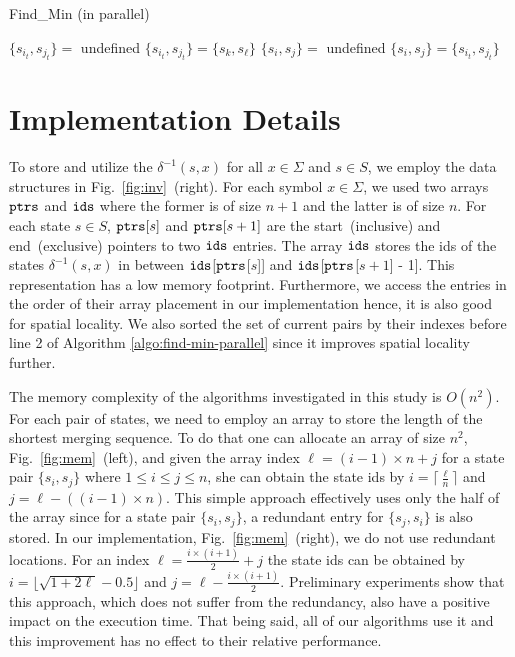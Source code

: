 \begin{algorithm}[ht]
	\caption{Find\_Min (in parallel)}
	\label{algo:find-min-parallel}
	
	{
	$\{ s_{i_t},s_{j_t} \} =$ undefined
	}
	{
		{
			$\{ s_{i_t},s_{j_t} \} = \{ s_k, s_\ell \}$
		}
	}
	$\{ s_i,s_j \} =$ undefined\;
	{
		{
			$\{ s_i,s_j \} = \{ s_{i_t},s_{j_t} \}$
		}
	}
\end{algorithm}

\section{Implementation Details}\label{sec:implementation}
To store and utilize the  $\delta^{-1}(s,x)$ for all $x \in \Sigma$ and $s \in S$, we employ the data structures in Fig.~\ref{fig:inv}~(right). For each symbol $x \in \Sigma$, we used two arrays ${\tt ptrs}$ and ${\tt ids}$ where the former is of size $n + 1$ and the latter is of size $n$. For each state $s \in S$, ${\tt ptrs}[s]$ and ${\tt ptrs}[s+1]$ are the start~(inclusive) and end~(exclusive) pointers to two ${\tt ids}$ entries.  The array ${\tt ids}$ stores the ids of the states $\delta^{-1}(s,x)$ in between ${\tt ids}$[{$\tt ptrs$}[$s$]]  and ${\tt ids}$[{$\tt ptrs$}[$s+1$] - 1]. This representation has a low memory footprint. Furthermore, we access the entries in the order of their array placement  in our implementation hence, it is also good for spatial locality. We also sorted the set of current pairs by their indexes before line 2 of Algorithm \ref{algo:find-min-parallel} since it improves spatial locality further.

The memory complexity of the algorithms investigated in this study is $O(n^2)$. For each pair of states, we need to employ an array to store the length of the shortest merging sequence. To do that one can allocate an array of size $n^2$, Fig.~\ref{fig:mem}~(left), and given the array index $\ell = (i-1) \times n + j$ for a state pair $\{s_i, s_j\}$ where $1  \leq i \leq j \leq n$, she can obtain the state ids by $i = \lceil{\frac{\ell}{n}} \rceil$  and $j =\ell - ((i -1) \times n)$. This simple approach effectively uses only the half of the array since for a state pair $\{s_i, s_j\}$, a redundant entry for $\{s_j, s_i\}$ is also stored. In our implementation, Fig.~\ref{fig:mem}~(right), we do not use redundant locations. For an index  $\ell = \frac{i \times (i+1)}{2} + j$ the state ids can be obtained by $i = \lfloor \sqrt{1 + 2\ell} - 0.5\rfloor$ and $j = \ell - \frac{i \times (i+1)}{2}$. Preliminary experiments show that this approach, which does not suffer from the redundancy,  also have a positive impact on the execution time. That being said, all of our algorithms use it and this improvement has no effect to their relative performance.

